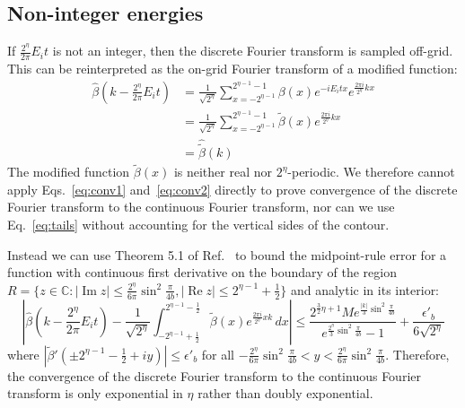 \documentclass[aps,floatfix,10pt,amssymb,amsfont,amsmath,superscriptaddress,float,nofootinbib,longbibliography,nobalancelastpage,twocolumn]{revtex4-2}
\begin{document}
\subsection{Non-integer energies}
If $\frac{2^{\eta}}{2\pi}E_it$ is not an integer, then the discrete Fourier transform is sampled off-grid. This can be reinterpreted as the on-grid Fourier transform of a modified function:
\begin{align}
    \hat \beta(k -\frac{2^{\eta}}{2\pi}E_it) &= \frac{1}{\sqrt{2^{\eta}}} \sum_{x=-2^{\eta-1}}^{2^{\eta-1}-1} \beta(x) e^{-iE_it x}e^{\frac{2\pi i}{2^{\eta}} kx}\\
    &= \frac{1}{\sqrt{2^{\eta}}} \sum_{x=-2^{\eta-1}}^{2^{\eta-1}-1} \tilde\beta(x)e^{\frac{2\pi i}{2^{\eta}} kx}\\
    &= \hat{\tilde\beta}(k)
\end{align}
The modified function $\tilde\beta(x)$ is neither real nor $2^{\eta}$-periodic. We therefore cannot apply Eqs.~\eqref{eq:conv1} and~\eqref{eq:conv2} directly to prove convergence of the discrete Fourier transform to the continuous Fourier transform, nor can we use Eq.~\eqref{eq:tails} without accounting for the vertical sides of the contour.

Instead we can use Theorem 5.1 of Ref.~\cite{javed2014trapezoidal} to bound the midpoint-rule error for a function with continuous first derivative on the boundary of the region $R = \{z \in \mathbb{C}: |\operatorname{Im} z| \leq  \frac{2^{\eta}}{6\pi}\sin^2\frac{\pi}{4b}, |\operatorname{Re} z| \leq 2^{\eta-1}+\frac{1}{2}\}$ and analytic in its interior:
\begin{equation}
    \left| \hat \beta\!\left(k-\frac{2^{\eta}}{2\pi}E_it\right) - \frac{1}{\sqrt{2^{\eta}}} \int_{-2^{\eta-1}+\frac{1}{2}}^{2^{\eta-1}-\frac{1}{2}}\tilde\beta(x)e^{\frac{2\pi i}{2^{\eta}}xk}\,dx \right| \leq \frac{2^{\frac{3}{2}\eta+1} Me^{\frac{|k|}{3}\sin^2 \frac{\pi}{4b}}}{e^{\frac{2^{\eta}}{3}\sin^2 \frac{\pi}{4b}}-1} + \frac{\epsilon'_{b}}{6\sqrt{2^{\eta}}}
\end{equation}
where $|\tilde\beta'(\pm2^{\eta-1}-\frac{1}{2}+iy)| \leq \epsilon'_{b}$ for all $-\frac{2^{\eta}}{6\pi}\sin^2\frac{\pi}{4b}<y<\frac{2^{\eta}}{6\pi}\sin^2\frac{\pi}{4b}$. Therefore, the convergence of the discrete Fourier transform to the continuous Fourier transform is only exponential in $\eta$ rather than doubly exponential.
\end{document}
